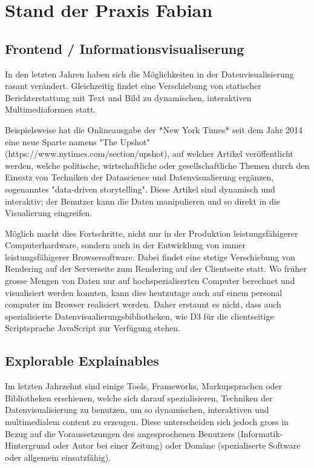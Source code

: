 \documentclass[a4paper,10.2pt,pdftex]{scrartcl}%
\begin{document}
\section{Stand der Praxis Fabian}
\subsection{Frontend / Informationsvisualiserung}
In den letzten Jahren haben sich die Möglichkeiten in der Datenvisualisierung rasant verändert. Gleichzeitig findet eine Verschiebung von statischer Berichterstattung mit Text und Bild zu dynamischen, interaktiven Multimediaformen statt.

Beispielsweise hat die Onlineausgabe der *New York Times* seit dem Jahr 2014 eine neue Sparte namens "The Upshot" (https://www.nytimes.com/section/upshot), auf welcher Artikel veröffentlicht werden, welche politische, wirtschaftliche oder gesellschaftliche Themen durch den Einsatz von Techniken der Datascience und Datenvisualierung ergänzen, sogenanntes "data-driven storytelling". Diese Artikel sind dynamisch und interaktiv; der Benutzer kann die Daten manipulieren und so direkt in die Visualierung eingreifen.

Möglich macht dies Fortschritte, nicht nur in der Produktion leistungsfähigerer Computerhardware, sondern auch in der Entwicklung von immer leistungsfähigerer Browsersoftware. Dabei findet eine stetige Verschiebung von Rendering auf der Serverseite zum Rendering auf der Clientseite statt. Wo früher grosse Mengen von Daten nur auf hochspezialiserten Computer berechnet und visualisiert werden konnten, kann dies heutzutage auch auf einem personal computer im Browser realisiert werden. Daher erstaunt es nicht, dass auch spezialisierte Datenvisualierungsbibliotheken, wie D3 für die clientseitige Scriptsprache JavaScript zur Verfügung stehen.

\subsection{Explorable Explainables}
Im letzten Jahrzehnt sind einige Tools, Frameworks, Markupsprachen oder Bibliotheken erschienen, welche sich darauf spezialisieren, Techniken der Datenvisualisierung zu benutzen, um so dynamischen, interaktiven und multimedialem content zu erzeugen. Diese unterscheiden sich jedoch gross in Bezug auf die Voraussetzungen des angesprochenen Benutzers (Informatik-Hintergrund oder Autor bei einer Zeitung) oder Domäne (spezialiserte Software oder allgemein einsatzfähig).
\end{document}
